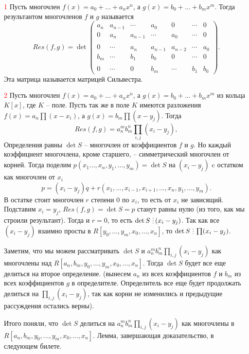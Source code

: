 \dfn \textcolor{red}{1} Пусть многочлен $f(x)=a_0+\dots+a_nx^n$, а $g(x)=b_0+\dots+b_mx^m$. Тогда результантом многочленов $f$ и $g$ называется $$Res(f,g)=  \det 
\begin{pmatrix}
a_n & a_{n-1} & \cdots & a_0 & 0 & \cdots & 0 \\
0 & a_n & a_{n-1} & \cdots & a_0 & \cdots & 0 \\
\\
0 & \cdots &  a_n & a_{n-1} & a_{n-2} & \cdots &  a_0 \\
b_m & \cdots & b_1 & b_0 & 0 & \cdots & 0 \\
 \\
0 & \cdots & 0 & b_m & \cdots & b_1 & b_0 
\end{pmatrix}.$$
Эта матрица называется матрицей Сильвестра. 
\edfn

\dfn \textcolor{red}{2} Пусть многочлен $f(x)=a_0+\dots+a_nx^n$, а $g(x)=b_0+\dots+b_mx^m$ из кольца $K[x]$, где $K$ -- поле. 
Пусть так же в поле $K$ имеются разложения $f(x)=a_n\prod(x-x_i)$, а $g(x)=b_m\prod (x-y_j)$. Тогда
$$Res(f,g)=a_n^mb_m^n \prod_{i,j} (x_i-y_j),$$ \edfn
\thrm Определения равны
\ethrm
\proof $\det S$ -- многочлен от коэффициентов $f$ и $g$. Но каждый коэффициент многочлена, кроме старшего, -- симметрический многочлен от корней.
Тогда поделим $p(x_1\dots,x_n,y_1,\dots,y_m)=\det S$ на $(x_i-y_j)$ c остатком как многочлен от $x_i$
$$p=(x_i-y_j)q+r(x_1,\dots, x_{i-1},x_{i+1},\dots,x_n,y_1,\dots,y_m).$$
В остатке стоит многочлен $r$ степени 0 по $x_i$, то есть от $x_i$ не зависящий. Подставим $x_i = y_j$, $Res(f, g) = \det S = p$ станут равны нулю (из того, как мы строили результант). 
Тогда и $r=0$, то есть $\det S \di (x_i-y_j)$. Так как все $(x_i - y_j)$ взаимно просты в $R[y_0, \ldots, y_m, x_0, \ldots, x_n]$, то $\det S \di \prod (x_i-y_j)$. 

Заметим, что мы можем рассматривать $\det S$ и $a_n^mb_m^n \prod_{i,j} (x_i-y_j)$ как многочлены над $R[a_n, b_m, y_0, \ldots, y_m, x_0, \ldots, x_n]$. Тогда
$\det S$ будет все еще делиться на второе определение. 
(вынесем $a_n$ из всех коэффициентов $f$ и $b_m$ из всех коэффициентов $g$ в определителе. Определитель все еще будет продолжать делиться на $\prod_{i,j} (x_i-y_j)$, 
так как корни не изменились и предыдущие рассуждения остались верны).

Итого поняли, что $\det S$ делиться на $a_n^m b_m^n \prod_{i,j} (x_i - y_j)$ как многочлены в $R[a_n, b_m, y_0, \ldots, y_m, x_0, \ldots, x_n]$. Лемма, завершающая доказательство, в следующем билете.

\endproof
